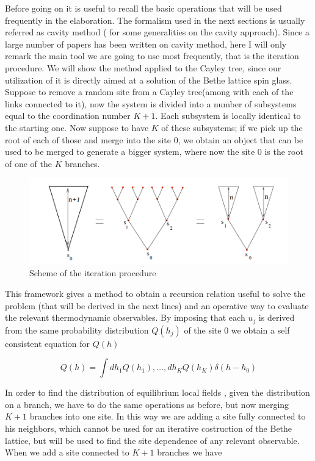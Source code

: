Before going on it is useful to recall the basic operations that will be used frequently in the elaboration. The formalism used in the next sections is usually referred as cavity method (\cite{beyond} for some generalities on the cavity approach). Since a large number of papers has been written on cavity method, here I will only remark the main tool we are going to use most frequently, that is the iteration procedure. We will show the method applied to the Cayley tree, since our utilization of it is directly aimed at a solution of the Bethe lattice spin glass.
Suppose to remove a random site from a Cayley tree(among with each of the links connected to it), now the system is divided into a number of subsystems equal to the coordination number $K+1$. Each subsystem is locally identical to the starting one.
Now suppose to have $K$ of these subsystems; if we pick up the root of each of those and merge into the site 0, we obtain an object that can be used to be merged to generate a bigger system, where now the site 0 is the root of one of the $K$ branches.

\begin{figure}[h]
\centering
\includegraphics[scale =0.6]{img/cavity.png}
\caption{Scheme of the iteration procedure}
\label{fig:cav}
\end{figure}

This framework gives a method to obtain a recursion relation useful to solve the problem (that will be derived in the next lines) and an operative way to evaluate the relevant thermodynamic observables.
By imposing that each $u_j$ is derived from the same probability distribution $Q(h_j)$ of the site 0 we obtain a self consistent equation for $Q(h)$

\begin{equation}
Q(h) = \int dh_1Q(h_1),\ldots,dh_KQ(h_K) \delta(h-h_0)
\label{RS}
\end{equation}

In order to find the distribution of equilibrium local fields , given the distribution on a branch, we have to do the same operations as before, but now merging $K+1$ branches into one site. In this way we are adding a site fully connected to his neighbors, which cannot be used for an iterative costruction of the Bethe lattice, but will be used to find the site dependence of any relevant observable. When we add a site connected to $K+1$ branches we have

